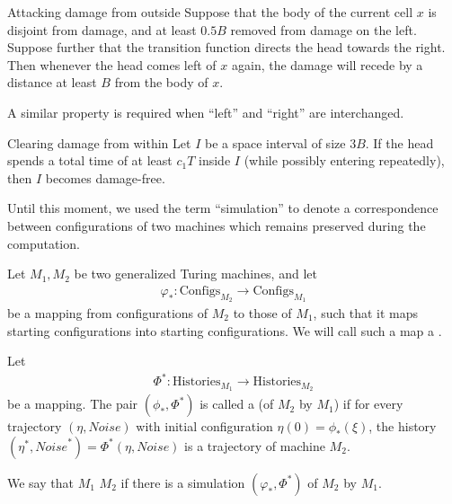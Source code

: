 \documentclass[12pt]{memoir}
\def\B{B}
\newcommand{\Configs}{\mathrm{Configs}}
\newcommand{\Noise}{\mathit{Noise}}
\newcommand{\Tu}{T}
\newcommand{\Histories}{\mathrm{Histories}}
\begin{document}
\begin{definition}[Trajectory]
\begin{flushdescription}
\item[Attacking damage from outside] \label{i:def.traj.attack-from-outside}
Suppose that the body of the current cell \( x \) is disjoint from damage, 
and at least \( 0.5\B \) removed from damage on the left.
Suppose further that the transition function directs the head towards the right.
Then whenever the head comes left  of \( x \) again, the  
damage will recede by a distance at least \( \B \) from the body of \( x \).

A similar property is required when ``left'' and ``right'' are interchanged.

\item[Clearing damage from within] \label{i:def.traj.damage-within}
Let \(  I  \) be a space interval of size \(  3\B  \).
If the head spends a total time of at least \(  c_{1}\Tu  \) inside \(  I  \) (while possibly
entering repeatedly), then \(  I  \) becomes damage-free.

\end{flushdescription}
\end{definition}


Until this moment, we used the term ``simulation'' to denote
a correspondence between configurations of
two machines which remains preserved during the computation.


\begin{definition}[Simulation] \label{def:simulation-central}
Let \( M_{1},M_{2} \) be two generalized Turing machines, and let
\begin{align*}
    \varphi_{*}:\Configs_{M_{2}} \to \Configs_{M_{1}}
\end{align*}
be a mapping from configurations of \( M_{2} \)
to those of \( M_{1} \), such that it maps
starting configurations into starting configurations.
We will call such a map a .

Let
\begin{align*}
   \Phi^{*}:\Histories_{M_{1}} \to \Histories_{M_{2}}
\end{align*}
be a mapping.
The pair \( (\phi_{*}, \Phi^{*})  \)
is called a  (of \(  M_{2}  \) by \(  M_{1}  \)) if for every
trajectory \(  (\eta, \Noise)  \) with initial
configuration \(  \eta(0)=\phi_{*}(\xi)  \),
the history \(  (\eta^{*},\Noise^{*})=\Phi^{*}(\eta,\Noise)  \) is
a trajectory of machine \(  M_{2}  \).

We say that \( M_{1} \)  \( M_{2} \) if there is a simulation
\( (\varphi_{*},\Phi^{*}) \) of \( M_{2} \) by \( M_{1} \).
\end{definition}
\end{document}
